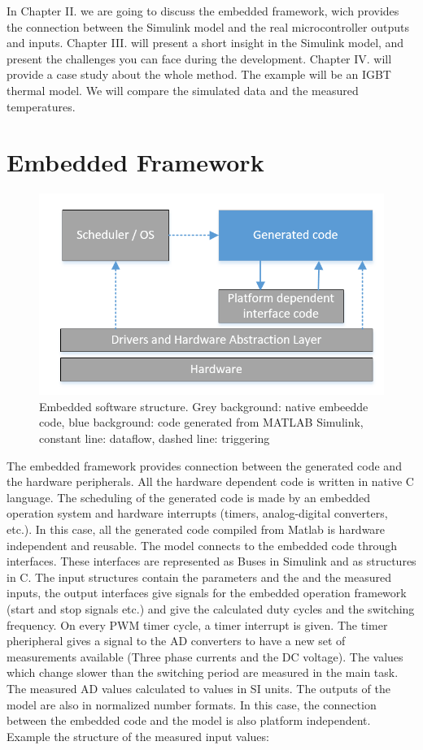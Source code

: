 In Chapter II. we are going to discuss the embedded framework, wich provides the connection between the Simulink model and the real microcontroller outputs and inputs. Chapter III. will present a short insight in the Simulink model, and present the challenges you can face during the development. Chapter IV. will provide a case study about the whole method. The example will be an IGBT thermal model. We will compare the simulated data and the measured temperatures.


\section{Embedded Framework}

\begin{figure}[h]
\centering
\includegraphics[width=0.8\columnwidth]{figures/SoftwareLayers.PNG}

\caption{Embedded software structure. Grey background: native embeedde code, blue background: code generated from MATLAB Simulink, constant line: dataflow, dashed line: triggering}
\label{software_structure}
\end{figure}


The embedded framework provides connection between the generated code and the hardware peripherals. All the hardware dependent code is written in native C language. The scheduling of the generated code is made by an embedded operation system and hardware interrupts (timers, analog-digital converters, etc.). In this case, all the generated code compiled from Matlab is hardware independent and reusable. The model connects to the embedded code through interfaces. These interfaces are represented as Buses in Simulink and as structures in C. The input structures contain the parameters and the and the measured inputs, the output interfaces give signals for the embedded operation framework (start and stop signals etc.) and give the calculated duty cycles and the switching frequency. 
On every PWM timer cycle, a timer interrupt is given. The timer pheripheral gives a signal to the AD converters to have a new set of measurements available (Three phase currents and the DC voltage). The values which change slower than the switching period are measured in the main task. The measured AD values calculated to values in SI units. The outputs of the model are also in normalized number formats. In this case, the connection between the embedded code and the model is also platform independent. Example the structure of the measured input values:

